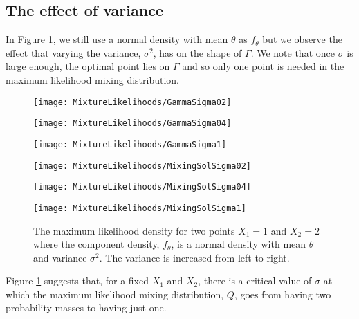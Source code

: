 	\subsection{The effect of variance}
	In Figure \ref{fig:variance of ftheta}, we still use a normal density with mean $\theta$ as $f_\theta$ but we observe the effect that varying the variance, $\sigma^2$, has on the shape of $\Gamma$. We note that once $\sigma$ is large enough, the optimal point lies on $\Gamma$ and so only one point is needed in the maximum likelihood mixing distribution.
	\begin{figure}[ht]
		\centering
		\begin{minipage}{0.3\textwidth}
			\texttt{[image: MixtureLikelihoods/GammaSigma02]}
		\end{minipage}
		\begin{minipage}{0.3\textwidth}
			\texttt{[image: MixtureLikelihoods/GammaSigma04]}
		\end{minipage}
		\begin{minipage}{0.3\textwidth}
			\texttt{[image: MixtureLikelihoods/GammaSigma1]}
		\end{minipage}
		\begin{minipage}{0.3\textwidth}
			\texttt{[image: MixtureLikelihoods/MixingSolSigma02]}
		\end{minipage}
		\begin{minipage}{0.3\textwidth}
			\texttt{[image: MixtureLikelihoods/MixingSolSigma04]}
		\end{minipage}
		\begin{minipage}{0.3\textwidth}
			\texttt{[image: MixtureLikelihoods/MixingSolSigma1]}
		\end{minipage}
		\caption{The maximum likelihood density for two points $X_1 = 1$ and $X_2 = 2$ where the component density, $f_\theta$, is a normal density with mean $\theta$ and variance $\sigma^2$. The variance is increased from left to right.}
		\label{fig:variance of ftheta}
	\end{figure}


		Figure \ref{fig:variance of ftheta} suggests that, for a fixed $X_1$ and $X_2$, there is a critical value of $\sigma$ at which the maximum likelihood mixing distribution, $Q$, goes from having two probability masses to having just one.
		
